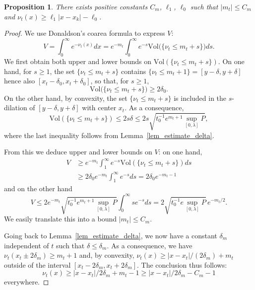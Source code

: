 \documentclass[JEP,XML,SOM,Unicode, NoEqCountersInSection, NoFloatCountersInSection]{cedram}
\theoremstyle{plain}
\newtheorem{prop}[thm]{Proposition}
\theoremstyle{definition}
\begin{document}
\begin{prop}
\label{prop_m_t}
There exists positive constants $C_m$, $\ell_1$, $\ell_0$ such
that $|m_t|\leq C_m$ and $\nu_t(x)\geq \ell_1|x-x_k|-\ell_0$.
\end{prop}

\begin{proof}
We use Donaldson's coarea formula \cite{Don08} to express $V$:
\begin{equation*}
V= \int_0^{\infty} e^{-\nu_t(x)}dx = e^{-m_t} \int_0^{\infty}e^{-s}\mathrm{Vol}\bigl(\{\nu_t\leq m_t+s\}\bigr) ds.
\end{equation*}
We first obtain both upper and lower bounds on $\mathrm{Vol}(\{\nu_t\leq m_t+s\})$.
On one hand, for $s\geq 1$, the set $\{\nu_t\leq m_t+s\}$ contains
$\{\nu_t\leq m_t+1\}=[y-\delta,y+\delta]$
hence also $[x_t-\delta_0,x_t+\delta_0]$, so that, for $s\geq 1$,
\begin{equation*}
\mathrm{Vol} \bigl(\{\nu_t\leq m_t+s\} \bigr)\geq 2\delta_0.
\end{equation*}
On the other hand, by convexity, the set $\{\nu_t\leq m_t+s\}$ is included in
the $s$-dilation of $[y-\delta,y+\delta]$ with center $x_t$.
As a consequence,
\begin{equation*}
\mathrm{Vol}(\{\nu_t\leq m_t+s\})\leq 2s\delta \leq 2s\sqrt{t_0^{-1}e^{m_t+1}\sup_{[0,\lambda]}P},
\end{equation*}
where the last inequality follows from Lemma~\ref{lem_estimate_delta}.

From this we deduce upper and lower bounds on $V$: on one hand,
\begin{align*}
V& \geq e^{-m_t} \int_1^{\infty}e^{-s}\mathrm{Vol}(\{\nu_t\leq m_t+s\}) ds\\
&\geq 2\delta_0 e^{-m_t} \int_1^{\infty}e^{-s}ds = 2\delta_0e^{-m_t-1}
\end{align*}
and on the other hand
\begin{equation*}
V\leq 2e^{-m_t}\sqrt{t_0^{-1}e^{m_t+1}\sup_{[0,\lambda]}P}\int_0^{\infty}se^{-s}ds
=2\sqrt{t_0^{-1}e\sup_{[0,\lambda]}P}\,e^{-m_t/2}.
\end{equation*}
We easily translate this into a bound $|m_t|\leq C_m$.

Going back to Lemma~\ref{lem_estimate_delta}, we now have a constant
$\delta_m$ independent of $t$ such that $\delta\leq \delta_m$.
As a consequence, we have $\nu_t(x_t\pm 2\delta_m)\geq m_t+1$ and, by convexity,
$\nu_t(x)\geq |x-x_t|/(2\delta_m)+m_t$
outside of the interval $[x_t-2\delta_m,x_t+2\delta_m]$.
The conclusion thus follows:
\begin{equation*}
\nu_t(x)\geq |x-x_t|/2\delta_m+m_t-1 \geq |x-x_t|/2\delta_m-C_m-1
\end{equation*}
everywhere.
\end{proof}
\end{document}
